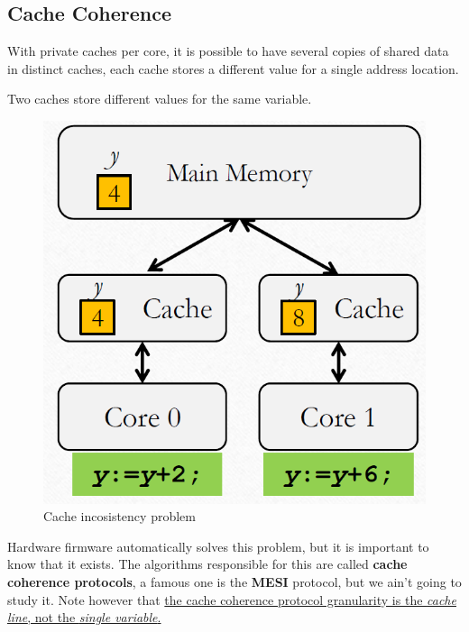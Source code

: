 \subsection{Cache Coherence}
\begin{paracol}{2}
   With private caches per core, it is possible to have several copies of shared data in distinct caches, each cache stores a different value for a single address location.
   
   \begin{definition}
      Two caches store different values for the same variable.
   \end{definition}
   
   \switchcolumn

   \begin{figure}[htbp]
      \centering
      \includegraphics{images/04/cache_coherence.png}
      \caption{Cache incosistency problem}
      \label{fig:04/cache_coherence}
   \end{figure}

\end{paracol}

Hardware firmware automatically solves this problem, but it is important to know that it exists.
The algorithms responsible for this are called \textbf{cache coherence protocols}, a famous one is the \textbf{MESI} protocol, but we ain't going to study it.
Note however that \ul{the cache coherence protocol granularity is the \textit{cache line}, not the \textit{single variable}.}
   

